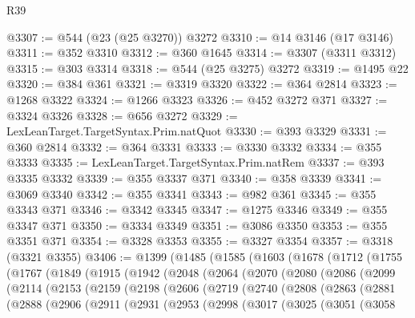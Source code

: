 \begin{lexlean}{R39}
\begin{coremodule}
@3307 := @544 (@23 (@25 @3270)) @3272
@3310 := @14 @3146 (@17 @3146)
@3311 := @352 @3310
@3312 := @360 @1645
@3314 := @3307 (@3311 @3312)
@3315 := @303 @3314
@3318 := @544 (@25 @3275) @3272
@3319 := @1495 @22
@3320 := @384 @361
@3321 := @3319 @3320
@3322 := @364 @2814
@3323 := @1268 @3322
@3324 := @1266 @3323
@3326 := @452 @3272 @371
@3327 := @3324 @3326
@3328 := @656 @3272
@3329 := LexLeanTarget.TargetSyntax.Prim.natQuot
@3330 := @393 @3329
@3331 := @360 @2814
@3332 := @364 @3331
@3333 := @3330 @3332
@3334 := @355 @3333
@3335 := LexLeanTarget.TargetSyntax.Prim.natRem
@3337 := @393 @3335 @3332
@3339 := @355 @3337 @371
@3340 := @358 @3339
@3341 := @3069 @3340
@3342 := @355 @3341
@3343 := @982 @361
@3345 := @355 @3343 @371
@3346 := @3342 @3345
@3347 := @1275 @3346
@3349 := @355 @3347 @371
@3350 := @3334 @3349
@3351 := @3086 @3350
@3353 := @355 @3351 @371
@3354 := @3328 @3353
@3355 := @3327 @3354
@3357 := @3318 (@3321 @3355)
@3406 := @1399
    (@1485
      (@1585
        (@1603
          (@1678
            (@1712
              (@1755
                (@1767
                  (@1849
                    (@1915
                      (@1942
                        (@2048
                          (@2064
                            (@2070
                              (@2080
                                (@2086
                                  (@2099
                                    (@2114
                                      (@2153
                                        (@2159
                                          (@2198
                                            (@2606
                                              (@2719
                                                (@2740
                                                  (@2808
                                                    (@2863
                                                      (@2881
                                                        (@2888
                                                          (@2906
                                                            (@2911
                                                              (@2931
                                                                (@2953
                                                                  (@2998
                                                                    (@3017
                                                                      (@3025
                                                                        (@3051
                                                                          (@3058

\end{coremodule}
\end{lexlean}
